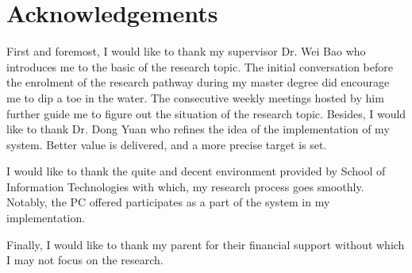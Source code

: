 \chapter*{Acknowledgements}

First and foremost, I would like to thank my supervisor Dr. Wei Bao who introduces me to the basic of the research topic. The initial conversation before the enrolment of the research pathway during my master degree did encourage me to dip a toe in the water. The consecutive weekly meetings hosted by him further guide me to figure out the situation of the research topic. Besides, I would like to thank Dr. Dong Yuan who refines the idea of the implementation of my system. Better value is delivered, and a more precise target is set.

I would like to thank the quite and decent environment provided by School of Information Technologies with which, my research process goes smoothly. Notably, the PC offered participates as a part of the system in my implementation.

Finally, I would like to thank my parent for their financial support without which I may not focus on the research.
